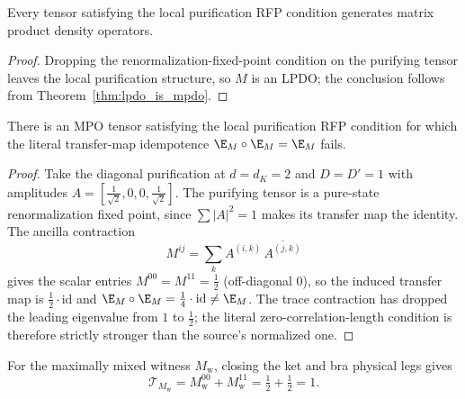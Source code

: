 \begin{theorem}
    \label{thm:local_purification_rfp_is_mpdo}
    \leanok
    Every tensor satisfying the local purification RFP condition generates
    matrix product density operators.
\end{theorem}

\begin{proof}\leanok
    Dropping the renormalization-fixed-point condition on the purifying tensor
    leaves the local purification structure, so $M$ is an LPDO; the conclusion
    follows from Theorem~\ref{thm:lpdo_is_mpdo}.
\end{proof}

\begin{theorem}
    \label{thm:local_purification_rfp_not_zcl}
    \leanok
    There is an MPO tensor satisfying the local purification RFP condition for
    which the literal transfer-map idempotence $\E_M\circ\E_M=\E_M$ fails.
\end{theorem}

\begin{proof}\leanok
    Take the diagonal purification at $d=d_K=2$ and $D=D'=1$ with amplitudes
    $A=[\tfrac{1}{\sqrt2},0,0,\tfrac{1}{\sqrt2}]$. The purifying tensor is a
    pure-state renormalization fixed point, since $\sum|A|^2=1$ makes its transfer
    map the identity. The ancilla contraction
    \[
        M^{ij}=\sum_k A^{(i,k)}\,\overline{A^{(j,k)}}
    \]
    gives the scalar entries $M^{00}=M^{11}=\tfrac12$ (off-diagonal $0$), so the
    induced transfer map is $\tfrac12\cdot\mathrm{id}$ and
    $\E_M\circ\E_M=\tfrac14\cdot\mathrm{id}\neq\E_M$. The trace contraction has
    dropped the leading eigenvalue from $1$ to $\tfrac12$; the literal
    zero-correlation-length condition is therefore strictly stronger than the
    source's normalized one.
\end{proof}

\begin{lemma}
    \label{lem:phys_trace_transfer_witnessM}
    \leanok
    For the maximally mixed witness $M_{\mathrm w}$, closing the ket and bra
    physical legs gives
    \[
        \mathcal T_{M_{\mathrm w}}
        =
        M_{\mathrm w}^{00}+M_{\mathrm w}^{11}
        =
        \tfrac12+\tfrac12
        =
        1 .
    \]
\end{lemma}


